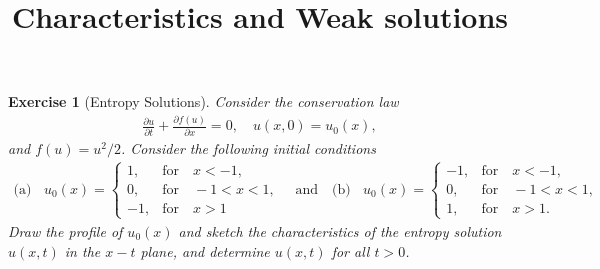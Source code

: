 \documentclass[10pt,letterpaper]{article}
\theoremstyle{break}
\newtheorem{exercise}{Exercise}
\begin{document}
\title{Characteristics and Weak solutions}
\date{}

\maketitle 

















\begin{exercise}[Entropy Solutions]
	Consider the conservation law 
	\begin{align}
		\frac{\partial u}{\partial t}
		+
		\frac{\partial f(u)}{\partial x}
		= 0,
		\quad
		u(x,0)=u_0(x),
	\end{align}
	and $f(u) = u^2/2$.
	Consider the following initial conditions
	\begin{align}
		\text{(a)}
		\,\,\;\;
		u_0(x) = 
		\left\{
		\begin{array}{cl}
		1, & \text{for} \quad x<-1,\\
		0, &\text{for} \quad -1<x< 1,\\
		-1, &\text{for} \quad x > 1
		\end{array}
		\right.
		\quad
		\text{and}
		\quad
		\text{(b)}
		\,\,\;\;
		u_0(x) = 
		\left\{
		\begin{array}{cl}
		-1, & \text{for} \quad x<-1,\\
		0, &\text{for} \quad -1<x < 1, \\
		1, &\text{for} \quad x > 1.
		\end{array}
		\right.
	\end{align}
	Draw the profile of $u_0(x)$ and sketch the characteristics
	of the entropy solution $u(x,t)$ in the $x-t$ plane, and
	determine $u(x,t)$ for all $t > 0$.
\end{exercise}
\end{document}
